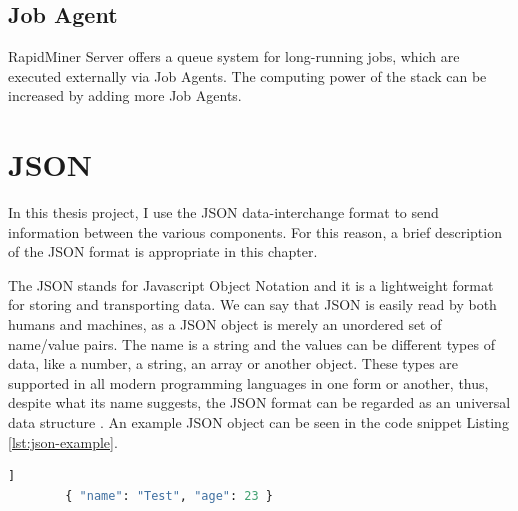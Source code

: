 \subsection{Job Agent}

RapidMiner Server offers a queue system for long-running jobs, which are executed externally via Job Agents. The computing power of the stack can be increased by adding more Job Agents.

\section{JSON}


In this thesis project, I use the JSON data-interchange format to send information between the various components. For this reason, a brief description of the JSON format is appropriate in this chapter.

The JSON stands for Javascript Object Notation and it is a lightweight format for storing and transporting data. We can say that JSON is easily read by both humans and machines, as a JSON object is merely an unordered set of name/value pairs. The name is a string and the values can be different types of data, like a number, a string, an array or another object. These types are supported in all modern programming languages in one form or another, thus, despite what its name suggests, the JSON format can be regarded as an universal data structure \cite{json}.
 An example JSON object can be seen in the code snippet Listing \ref{lst:json-example}.

\begin{center}
	\begin{minipage}{0.6\linewidth}
		\begin{lstlisting}[language=Python, caption={Example JSON}, label={lst:json-example}]]
		{ "name": "Test", "age": 23 }\end{lstlisting}
	\end{minipage}
\end{center}





